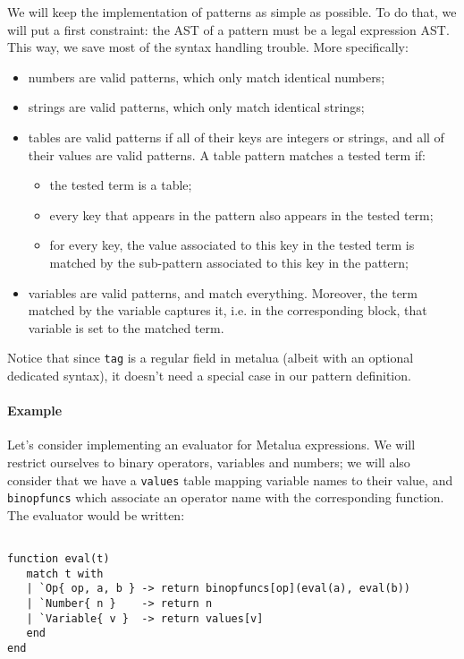 We will keep the implementation of patterns as simple as possible. To
do that, we will put a first constraint: the AST of a pattern must be
a legal expression AST. This way, we save most of the syntax handling
trouble. More specifically:

\begin{itemize}
\item numbers are valid patterns, which only match identical numbers;
\item strings are valid patterns, which only match identical strings;
\item tables are valid patterns if all of their keys are integers or
  strings, and all of their values are valid patterns. A table pattern
  matches a tested term if:
  \begin{itemize}
  \item the tested term is a table;
  \item every key that appears in the pattern also appears in the
    tested term;
  \item for every key, the value associated to this key in the tested
    term is matched by the sub-pattern associated to this key in the
    pattern;
  \end{itemize}
\item variables are valid patterns, and match everything. Moreover,
  the term matched by the variable captures it, i.e. in the
  corresponding block, that variable is set to the
  matched term.
\end{itemize}

Notice that since \verb|tag| is a regular field in metalua (albeit
with an optional dedicated syntax), it doesn't need a special case in
our pattern definition.

\paragraph{Example} Let's consider implementing an evaluator for
Metalua expressions. We will restrict ourselves to binary operators,
variables and numbers; we will also consider that we have a
\verb|values| table mapping variable names to their value, and
\verb|binopfuncs| which associate an operator name with the corresponding
function. The evaluator would be written:

\begin{Verbatim}[fontsize=\scriptsize]

function eval(t)
   match t with
   | `Op{ op, a, b } -> return binopfuncs[op](eval(a), eval(b))
   | `Number{ n }    -> return n
   | `Variable{ v }  -> return values[v]
   end
end
\end{Verbatim}

